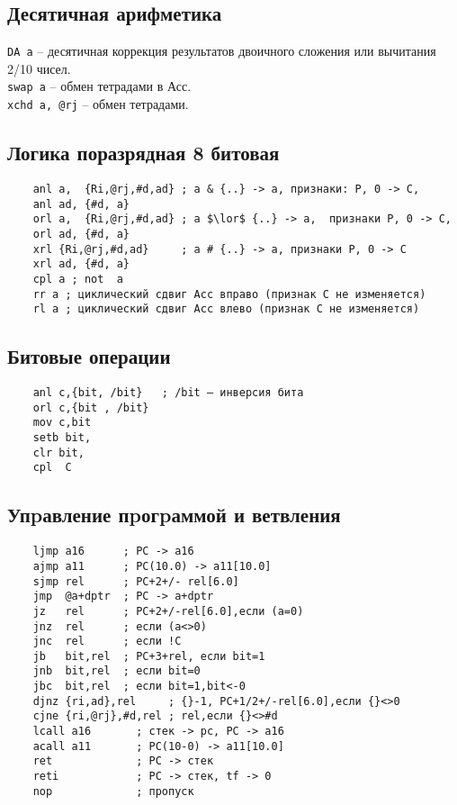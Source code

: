 \documentclass[12pt, a4paper] {ncc}
\begin{document}
        \subsection{Десятичная арифметика}
             \texttt{DA a}  -- десятичная коррекция результатов двоичного сложения или вычитания 2/10 чисел. \\
             \texttt{swap a} -- обмен тетрадами в Асс. \\
             \texttt{xchd  a, @rj} -- обмен тетрадами. \\
        \subsection{Логика поразрядная 8 битовая}
            \begin{verbatim}
    anl a,  {Ri,@rj,#d,ad} ; a & {..} -> a, признаки: P, 0 -> C,
    anl ad, {#d, a}
    orl a,  {Ri,@rj,#d,ad} ; a $\lor$ {..} -> a,  признаки P, 0 -> C,
    orl ad, {#d, a}
    xrl {Ri,@rj,#d,ad}     ; a # {..} -> a, признаки P, 0 -> C
    xrl ad, {#d, a}
    cpl a ; not  a
    rr a ; циклический сдвиг Асс вправо (признак С не изменяется)
    rl a ; циклический сдвиг Асс влево (признак С не изменяется)
            \end{verbatim}

        \subsection{Битовые  операции}
            \begin{verbatim}
    anl c,{bit, /bit}   ; /bit – инверсия бита
    orl c,{bit , /bit}
    mov c,bit
    setb bit,
    clr bit,
    cpl  C
            \end{verbatim}
        \subsection{Упpавление пpогpаммой и ветвления}

            \begin{verbatim}
    ljmp a16      ; PC -> a16
    ajmp a11      ; PC(10.0) -> a11[10.0]
    sjmp rel      ; PC+2+/- rel[6.0]
    jmp  @a+dptr  ; PC -> a+dptr
    jz   rel      ; PC+2+/-rel[6.0],если (a=0)
    jnz  rel      ; если (a<>0)
    jnc  rel      ; если !С
    jb   bit,rel  ; PC+3+rel, если bit=1
    jnb  bit,rel  ; если bit=0
    jbc  bit,rel  ; если bit=1,bit<-0
    djnz {ri,ad},rel     ; {}-1, PC+1/2+/-rel[6.0],если {}<>0
    cjne {ri,@rj},#d,rel ; rel,если {}<>#d
    lcall a16       ; стек -> pc, PC -> a16
    acall a11       ; PC(10-0) -> a11[10.0]
    ret             ; PC -> стек
    reti            ; PC -> стек, tf -> 0
    nop             ; пропуск
            \end{verbatim}
\end{document}
